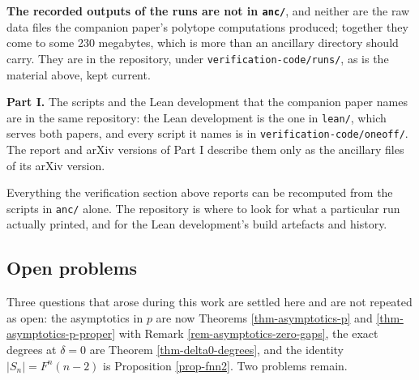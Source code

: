 \documentclass[11pt, a4paper, abstract=yes]{scrartcl}
\theoremstyle{definition}
\theoremstyle{remark}
\theoremstyle{plain}
\let\autocite\cite
\begin{document}
\textbf{\textbf{The recorded outputs of the runs are not in \texttt{anc/}}}, and neither are the raw data files the
companion paper's polytope computations produced; together they come to some 230 megabytes, which
is more than an ancillary directory should carry. They are in the repository, under
\texttt{verification-code/runs/}, as is the material above, kept current.

\textbf{Part I.} The scripts and the Lean development that the companion paper \autocite{SnellmanArticle1}
names are in the same repository: the Lean development is the one in \texttt{lean/}, which serves both
papers, and every script it names is in \texttt{verification-code/oneoff/}. The report and arXiv versions
of Part I describe them only as the ancillary files of its arXiv version.

Everything the verification section above reports can be recomputed from the scripts in \texttt{anc/}
alone. The repository is where to look for what a particular run actually printed, and for the
Lean development's build artefacts and history.
\subsection{Open problems}
\label{sec:org589826f}

Three questions that arose during this work are settled here and are not repeated as open: the
asymptotics in \(p\) are now Theorems \ref{thm-asymptotics-p}
and \ref{thm-asymptotics-p-proper} with Remark \ref{rem-asymptotics-zero-gaps}, the exact degrees at
\(\delta=0\) are Theorem \ref{thm-delta0-degrees}, and the identity \(\lvert S_n\rvert=F^n(n-2)\)
is Proposition \ref{prop-fnn2}. Two problems remain.
\end{document}
